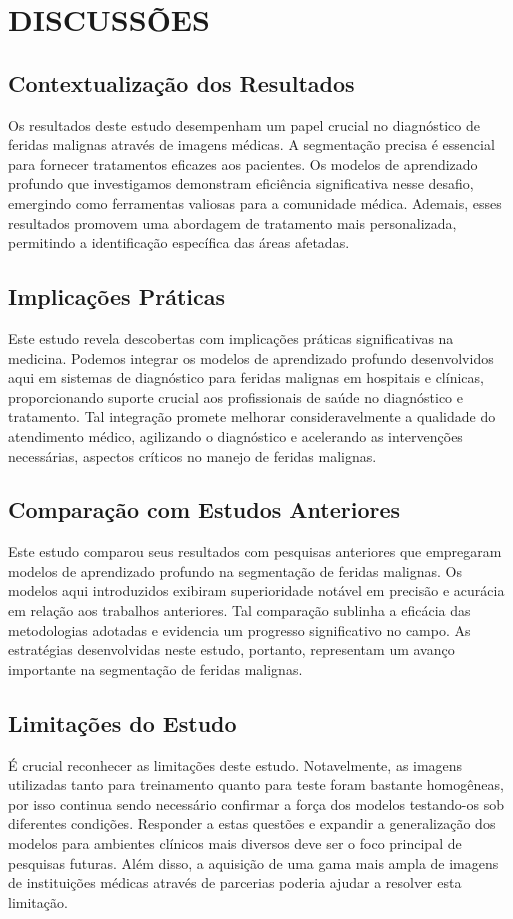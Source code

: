 \section{DISCUSSÕES}

\subsection{Contextualização dos Resultados}

Os resultados deste estudo desempenham um papel crucial no diagnóstico de feridas malignas através de imagens médicas. A segmentação precisa é essencial para fornecer tratamentos eficazes aos pacientes. Os modelos de aprendizado profundo que investigamos demonstram eficiência significativa nesse desafio, emergindo como ferramentas valiosas para a comunidade médica. Ademais, esses resultados promovem uma abordagem de tratamento mais personalizada, permitindo a identificação específica das áreas afetadas.

\subsection{Implicações Práticas}

Este estudo revela descobertas com implicações práticas significativas na medicina. Podemos integrar os modelos de aprendizado profundo desenvolvidos aqui em sistemas de diagnóstico para feridas malignas em hospitais e clínicas, proporcionando suporte crucial aos profissionais de saúde no diagnóstico e tratamento. Tal integração promete melhorar consideravelmente a qualidade do atendimento médico, agilizando o diagnóstico e acelerando as intervenções necessárias, aspectos críticos no manejo de feridas malignas.


\subsection{Comparação com Estudos Anteriores}
Este estudo comparou seus resultados com pesquisas anteriores que empregaram modelos de aprendizado profundo na segmentação de feridas malignas. Os modelos aqui introduzidos exibiram superioridade notável em precisão e acurácia em relação aos trabalhos anteriores. Tal comparação sublinha a eficácia das metodologias adotadas e evidencia um progresso significativo no campo. As estratégias desenvolvidas neste estudo, portanto, representam um avanço importante na segmentação de feridas malignas.


\subsection{Limitações do Estudo}
É crucial reconhecer as limitações deste estudo. Notavelmente, as imagens utilizadas tanto para treinamento quanto para teste foram bastante homogêneas, por isso continua sendo necessário confirmar a força dos modelos testando-os sob diferentes condições. Responder a estas questões e expandir a generalização dos modelos para ambientes clínicos mais diversos deve ser o foco principal de pesquisas futuras. Além disso, a aquisição de uma gama mais ampla de imagens de instituições médicas através de parcerias poderia ajudar a resolver esta limitação.


